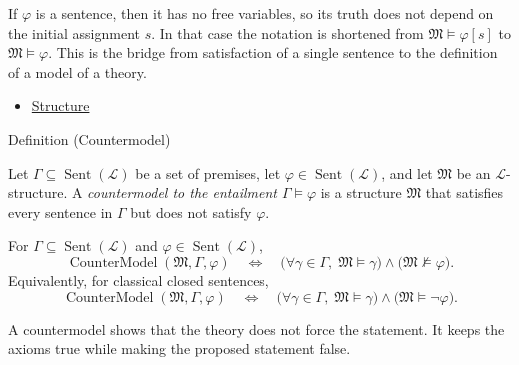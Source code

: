 \begin{remark*}[Sentences]
If $\varphi$ is a sentence, then it has no free variables, so its truth does
not depend on the initial assignment $s$. In that case the notation is
shortened from $\mathfrak{M}\vDash\varphi[s]$ to $\mathfrak{M}\vDash\varphi$.
This is the bridge from satisfaction of a single sentence to the definition of
a model of a theory.
\end{remark*}

\begin{dependencies}
\begin{itemize}
  \item \hyperref[def:axiom-systems-structure]{Structure}
\end{itemize}
\end{dependencies}

\begin{definitionbox}{Definition (Countermodel)}
\begin{definition}[Countermodel]
\label{def:axiom-systems-countermodel}
Let $\Gamma\subseteq\operatorname{Sent}(\mathcal{L})$ be a set of premises,
let $\varphi\in\operatorname{Sent}(\mathcal{L})$, and let $\mathfrak{M}$ be
an $\mathcal{L}$-structure. A \emph{countermodel to the entailment
$\Gamma\vDash\varphi$} is a structure $\mathfrak{M}$ that satisfies every
sentence in $\Gamma$ but does not satisfy $\varphi$.
\end{definition}
\end{definitionbox}

\begin{remark*}
For $\Gamma\subseteq\operatorname{Sent}(\mathcal{L})$ and
$\varphi\in\operatorname{Sent}(\mathcal{L})$,
\[
  \operatorname{CounterModel}(\mathfrak{M},\Gamma,\varphi)
  \quad\Longleftrightarrow\quad
  \bigl(\forall \gamma\in\Gamma,\; \mathfrak{M}\vDash\gamma\bigr)
  \land
  \bigl(\mathfrak{M}\not\vDash\varphi\bigr).
\]
Equivalently, for classical closed sentences,
\[
  \operatorname{CounterModel}(\mathfrak{M},\Gamma,\varphi)
  \quad\Longleftrightarrow\quad
  \bigl(\forall \gamma\in\Gamma,\; \mathfrak{M}\vDash\gamma\bigr)
  \land
  \bigl(\mathfrak{M}\vDash\neg\varphi\bigr).
\]
\end{remark*}

\begin{remark*}[Interpretation]
A countermodel shows that the theory does not force the statement. It keeps
the axioms true while making the proposed statement false.
\end{remark*}

